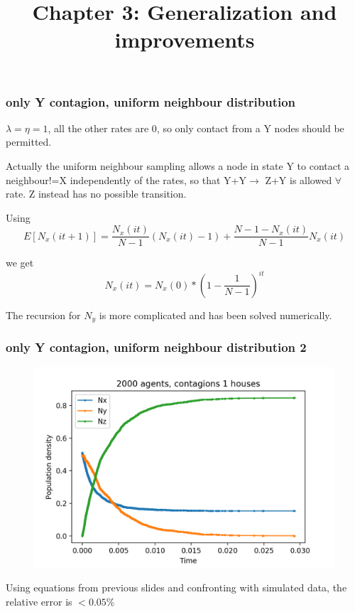 \documentclass{beamer}
\begin{document}
		
	\begin{frame}
	\title{Chapter 3: Generalization and improvements}
	\subtitle{}
	\date{}
	\titlepage
	\end{frame}


\begin{frame}
	\frametitle{only Y contagion, uniform neighbour distribution}
	
	 $\lambda=\eta=1$, all the other rates are 0, so only contact from a Y nodes should be permitted.
	
	\vspace{5 pt}
	 
	 Actually the uniform neighbour sampling allows a node in state Y to contact a neighbour!=X independently of the rates, so that Y+Y$\rightarrow$ Z+Y is allowed $\forall$ rate. Z instead has no possible transition.
	
	Using $$E[N_x(it+1)]=\frac{N_x(it)}{N-1} (N_x(it)-1)+\frac{N-1-N_x(it)}{N-1} N_x(it)$$
	
	we get $$N_x(it)=N_x(0)*(1-\frac{1}{N-1})^{it}$$	
	
	The recursion for $N_y$ is more complicated and has been solved numerically.

\end{frame}

	\begin{frame}
	\frametitle{only Y contagion, uniform neighbour distribution 2}
		\begin{figure}
			\centering
			\includegraphics[width=0.5\linewidth]{only_Y_contagion_2000_complete_graph_uniform_neighbour}
			\caption*{}
			\label{fig:onlyycontagion2000completegraphuniformneighbour}
		\end{figure}
	
	Using equations from previous slides and confronting with simulated data, the relative error is $< 0.05\%$
	
	\vspace{10 pt}
	\end{frame}
\end{document}
